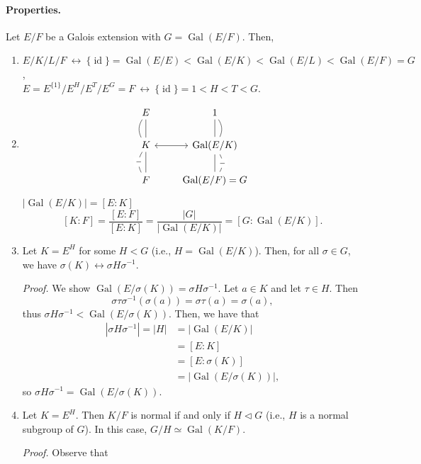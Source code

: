 \documentclass[twoside]{article}
\DeclareMathOperator\Gal{Gal}
\DeclareMathOperator\id{id}
\theoremstyle{remark}
\begin{document}
\paragraph{Properties.}
Let \(E/F\) be a Galois extension with \(G = \Gal(E/F)\). Then,
\begin{enumerate}[label=(\arabic*)]
  \item \(E/K/L/F ~\longleftrightarrow~ \{\id\} = \Gal(E/E) < \Gal(E/K) < \Gal(E/L) < \Gal(E/F) = G\), \\
  \(E = E^{\{1\}} / E^H / E^T / E^G = F ~\longleftrightarrow~ \{\id\} = 1 < H < T < G\).
  \item
  \begin{displaymath}
    \begin{tikzcd}
      E \dar[dash]\dar[dash,bend right] & 1 \dar[dash]\dar[dash,bend left] \\
      K \rar[leftrightarrow]\dar[dash]\dar[dash,bend right,"-"description] & \Gal(E/K) \dar[dash]\dar[dash,bend left,"-"description] \\
      F & \Gal(E/F) = G
    \end{tikzcd}
  \end{displaymath}
  \(\lvert\Gal(E/K)\rvert = [E:K]\)
  \[ [K:F] = \frac{[E:F]}{[E:K]} = \frac{|G|}{\lvert\Gal(E/K)\rvert} = [G:\Gal(E/K)]. \]
  \item Let \(K = E^H\) for some \(H < G\) (i.e., \(H = \Gal(E/K)\)). Then, for all \(\sigma \in G\), we have \(\sigma(K) \leftrightarrow \sigma H \sigma^{-1}\). \par
  \noindent\textit{Proof.} We show \(\Gal(E/\sigma(K)) = \sigma H \sigma^{-1}\). Let \(a \in K\) and let \(\tau \in H\). Then
  \[ \sigma\tau\sigma^{-1}(\sigma(a)) = \sigma\tau(a) = \sigma(a), \]
  thus \(\sigma H \sigma^{-1} < \Gal(E/\sigma(K))\). Then, we have that
  \begin{align*}
    |\sigma H \sigma^{-1}| = |H| & = \lvert\Gal(E/K)\rvert \\
    & = [E:K] \\
    & = [E:\sigma(K)] \\
    & = \lvert\Gal(E/\sigma(K))\rvert,
  \end{align*}
  so \(\sigma H \sigma^{-1} = \Gal(E/\sigma(K))\).
  \item Let \(K = E^H\). Then \(K/F\) is normal if and only if \(H \vartriangleleft G\) (i.e., \(H\) is a normal subgroup of \(G\)). In this case, \(G/H \simeq \Gal(K/F)\). \par
  \noindent\textit{Proof.}
  Observe that
  \begin{align*}

\end{align*}
\end{enumerate}
\end{document}

